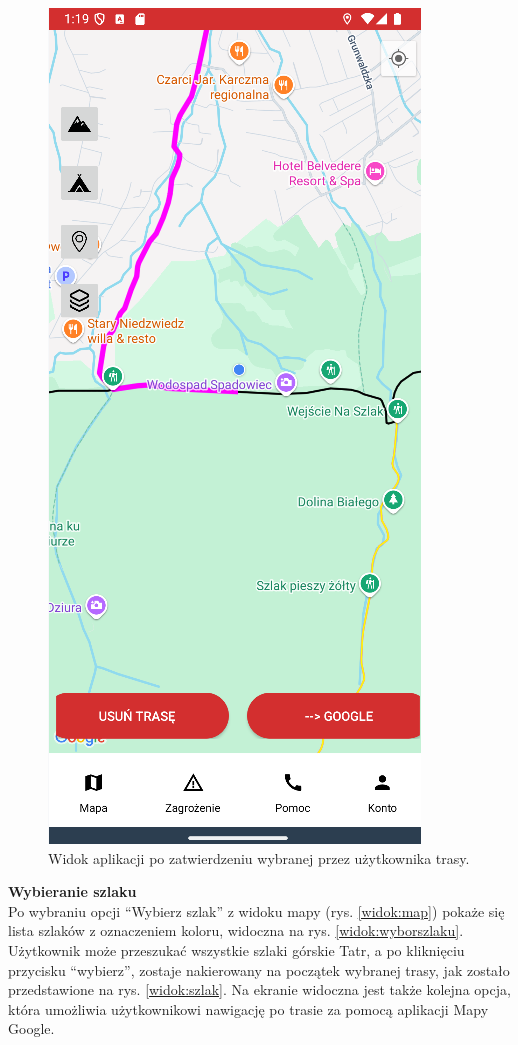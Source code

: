 \begin{figure}[H]
    \centering
    \includegraphics[scale=0.5]{img/imp/widok-trasa.png}
    \caption{Widok aplikacji po zatwierdzeniu wybranej przez użytkownika trasy.}
    \label{widok:zatwierdztrase}
\end{figure}

\textbf{Wybieranie szlaku} \\
\indent Po wybraniu opcji “Wybierz szlak” z widoku mapy (rys. \ref{widok:map}) pokaże się lista szlaków z oznaczeniem koloru, widoczna na rys. \ref{widok:wyborszlaku}. Użytkownik może przeszukać wszystkie szlaki górskie Tatr, a po kliknięciu przycisku “wybierz”, zostaje nakierowany na początek wybranej trasy, jak zostało przedstawione na rys. \ref{widok:szlak}. Na ekranie widoczna jest także kolejna opcja, która umożliwia użytkownikowi nawigację po trasie za pomocą aplikacji Mapy Google.\\


